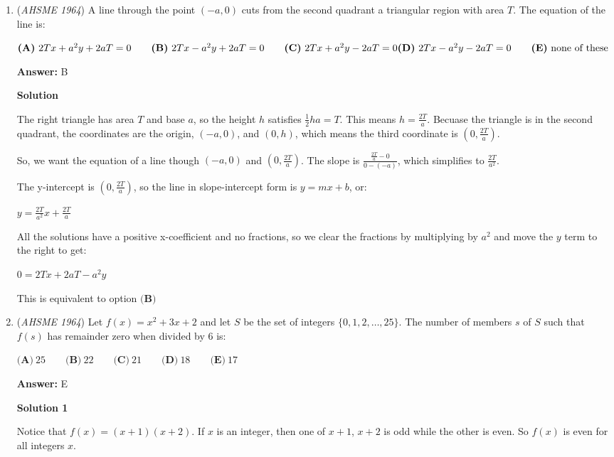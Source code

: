 \begin{enumerate}
	\item (\textit{AHSME 1964}) A line through the point $(-a,0)$ cuts from the second quadrant a triangular region with area $T$. The equation of the line is:


 $\textbf{(A)}\ 2Tx+a^2y+2aT=0 \qquad \textbf{(B)}\ 2Tx-a^2y+2aT=0 \qquad \textbf{(C)}\ 2Tx+a^2y-2aT=0 \qquad \\ \textbf{(D)}\ 2Tx-a^2y-2aT=0 \qquad \textbf{(E)}\ \text{none of these}$

 \textbf{Answer: }B



\textbf{Solution}

The right triangle has area $T$ and base $a$, so the height $h$ satisfies $\frac{1}{2}ha = T$.  This means $h = \frac{2T}{a}$.  Becuase the triangle is in the second quadrant, the coordinates are the origin, $(-a, 0)$, and $(0, h)$, which means the third coordinate is $(0, \frac{2T}{a})$.

 So, we want the equation of a line though $(-a, 0)$ and $(0, \frac{2T}{a})$.  The slope is $\frac{\frac{2T}{a} - 0}{0 - (-a)}$, which simplifies to $\frac{2T}{a^2}$.

 The y-intercept is $(0, \frac{2T}{a})$, so the line in slope-intercept form is $y = mx + b$, or:

 
$y = \frac{2T}{a^2}x + \frac{2T}{a}$

 All the solutions have a positive x-coefficient and no fractions, so we clear the fractions by multiplying by $a^2$ and move the $y$ term to the right to get:

 $0 = 2Tx + 2aT - a^2y$

 This is equivalent to option $\boxed{\textbf{(B)}}$



	\item (\textit{AHSME 1964}) Let $f(x)=x^2+3x+2$ and let $S$ be the set of integers $\{0, 1, 2, \dots , 25 \}$. 
The number of members $s$ of $S$ such that $f(s)$ has remainder zero when divided by $6$ is:


 $\textbf{(A)}\ 25\qquad \textbf{(B)}\ 22\qquad \textbf{(C)}\ 21\qquad \textbf{(D)}\ 18 \qquad \textbf{(E)}\ 17$

 \textbf{Answer: }E



\textbf{Solution 1}

Notice that $f(x) = (x+1)(x+2)$.  If $x$ is an integer, then one of $x+1$, $x+2$ is odd while the other is even.  So $f(x)$ is even for all integers $x$.


\end{enumerate}
